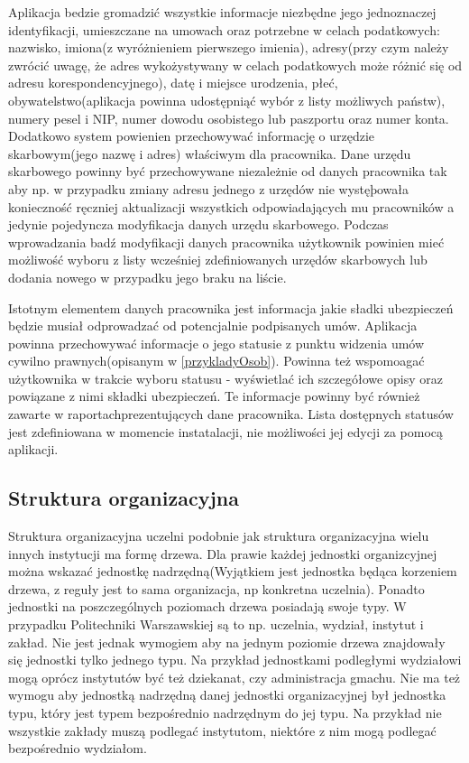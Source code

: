 Aplikacja bedzie gromadzić wszystkie informacje niezbędne jego jednoznaczej identyfikacji, umieszczane na umowach oraz potrzebne w celach podatkowych: nazwisko, imiona(z wyróżnieniem pierwszego imienia), adresy(przy czym należy zwrócić uwagę, że adres wykożystywany w celach podatkowych może różnić się od adresu korespondencyjnego), datę i miejsce urodzenia, płeć, obywatelstwo(aplikacja powinna udostępniąć wybór z listy możliwych państw), numery pesel i NIP, numer dowodu osobistego lub paszportu oraz numer konta. Dodatkowo system powienien przechowywać informację o urzędzie skarbowym(jego nazwę i adres) właściwym dla pracownika. Dane urzędu skarbowego powinny być przechowywane niezależnie od danych pracownika tak aby np. w przypadku zmiany adresu jednego z urzędów nie wystęþowała konieczność ręczniej aktualizacji wszystkich odpowiadających mu pracowników a jedynie pojedyncza modyfikacja danych urzędu skarbowego. Podczas wprowadzania badź modyfikacji danych pracownika użytkownik powinien mieć możliwość wyboru z listy wcześniej zdefiniowanych urzędów skarbowych lub dodania nowego w przypadku jego braku na liście.

Istotnym elementem danych pracownika jest informacja jakie sładki ubezpieczeń będzie musiał odprowadzać od potencjalnie podpisanych umów. Aplikacja powinna przechowywać informacje o jego statusie z punktu widzenia umów cywilno prawnych(opisanym w \ref{przykladyOsob}). Powinna też wspomoagać użytkownika w trakcie wyboru statusu - wyświetlać ich szczegółowe opisy oraz powiązane z nimi składki ubezpieczeń. Te informacje powinny być również zawarte w raportachprezentujących dane pracownika. Lista dostępnych statusów jest zdefiniowana w momencie instatalacji, nie możliwości jej edycji za pomocą aplikacji.

\subsection[Struktura organizacyjna][Struktura organizacyjna]{Struktura organizacyjna}
Struktura organizacyjna uczelni podobnie jak struktura organizacyjna wielu innych instytucji ma formę drzewa. Dla prawie każdej jednostki organizcyjnej można wskazać jednostkę nadrzędną(Wyjątkiem jest jednostka będąca korzeniem drzewa, z reguły jest to sama organizacja, np konkretna uczelnia). Ponadto jednostki na poszczególnych poziomach drzewa posiadają swoje typy. W przypadku Politechniki Warszawskiej są to np. uczelnia, wydział, instytut i zakład. Nie jest jednak wymogiem aby na jednym poziomie drzewa znajdowały się jednostki tylko jednego typu. Na przykład jednostkami podległymi wydziałowi mogą oprócz instytutów być też dziekanat, czy administracja gmachu. Nie ma też wymogu aby jednostką nadrzędną danej jednostki organizacyjnej był jednostka typu, który jest typem bezpośrednio nadrzędnym do jej typu. Na przykład nie wszystkie zakłady muszą podlegać instytutom, niektóre z nim mogą podlegać bezpośrednio wydziałom. 

